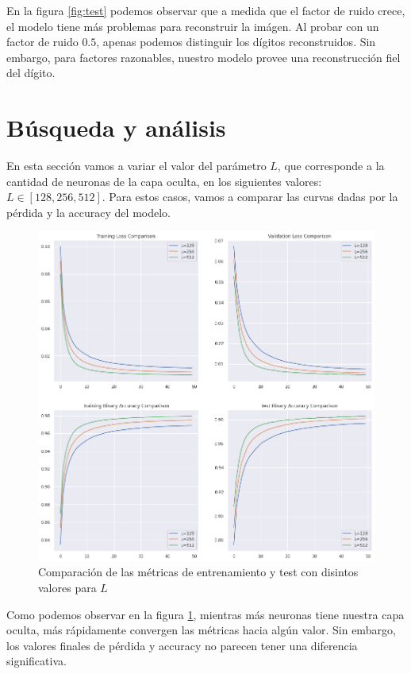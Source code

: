 \documentclass [a4paper,12pt,oneside,final]{article}
\begin{document}
En la figura \ref{fig:test} podemos observar que a medida que el factor de ruido crece, el modelo tiene más problemas para reconstruir la imágen. Al probar con un factor de ruido $0.5$, apenas podemos distinguir los dígitos reconstruidos. Sin embargo, para factores razonables, nuestro modelo provee una reconstrucción fiel del dígito. 

\section{Búsqueda y análisis}

En esta sección vamos a variar el valor del parámetro $L$, que corresponde a la cantidad de neuronas de la capa oculta, en los siguientes valores: $L \in [128, 256, 512]$. Para estos casos, vamos a comparar las curvas dadas por la pérdida y la accuracy del modelo.

\pagebreak

\begin{figure}[ht]
  \centering
  \includegraphics[width=15cm,keepaspectratio]{./graficos/metrics_comparison.png}
  \caption{Comparación de las métricas de entrenamiento y test con disintos valores para $L$}\label{fig:metrics_comparison}
\end{figure}

Como podemos observar en la figura \ref{fig:metrics_comparison}, mientras más neuronas tiene nuestra capa oculta, más rápidamente convergen las métricas hacia algún valor. Sin embargo, los valores finales de pérdida y accuracy no parecen tener una diferencia significativa.
\end{document}
